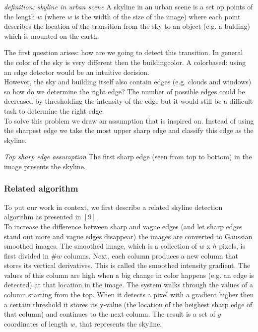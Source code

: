 \documentclass[10pt]{article}
\begin{document}
\textit{definition: skyline in urban scene}
A skyline in an urban scene is a set op points of the length $w$ (where $w$ is the
width of the size of the image) where each point describes the location of the
transition from the sky to an object (e.g. a bulding) which is mounted on the earth.

The first question arises: how are we going to detect this transition. In
general the color of the sky is very different then the buildingcolor. A
colorbased: using an edge detector would be an intuitive decision.\\
However, the sky and building itself also contain edges (e.g. clouds and 
windows) so how do we determine the right edge?
The number of possible edges could be decreased by thresholding the intensity of
the edge but it would still be a difficult task to determine the right edge.\\

To solve this problem we draw an assumption that is inspired on.
Instead of using the sharpest edge we take the most upper sharp edge and
classify this edge as the skyline.

\textit{Top sharp edge assumption}
The first sharp edge (seen from top to bottom) in the image 
presents the skyline.




\subsubsection{Related algorithm}
To put our work in context, we first describe
a related skyline detection algorithm as presented in %
$[9]$.\\

To increase the difference between sharp and vague edges (and let sharp edges
stand out more and vague edges disappear) the images are converted to Gaussian
smoothed images.  The smoothed image, which is a collection of $w$ x $h$ pixels,
is first divided in \#$w$ columns.  Next, each column produces a new column that
stores its vertical derivatives. This is called the smoothed intensity gradient.
The values of this column are high when a big change in color happens (e.g. an
edge is detected) at that location in the image. 
The system walks through the values of a column starting from the top.  When it
detects a pixel with a gradient higher then a certain threshold it stores its
y-value (the location of the heighest sharp edge of that column) and continues
to the next column.  The result is a set of $y$ coordinates of length $w$, that
represents the skyline. 
\end{document}
